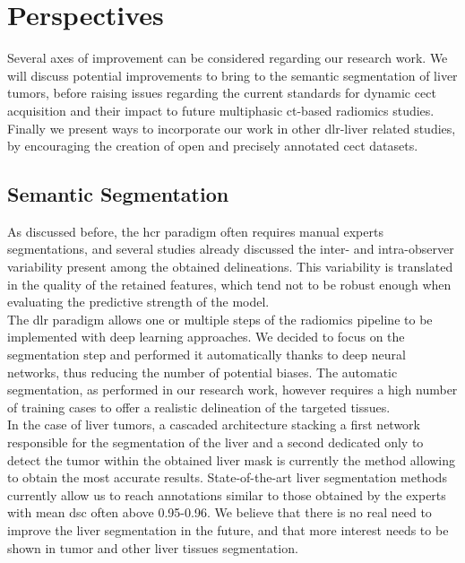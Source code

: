 \section*{Perspectives}
\label{sec:Perspectives}

Several axes of improvement can be considered regarding our research work.
We will discuss potential improvements to bring to the 
semantic segmentation of liver tumors, before raising issues regarding
the current standards for dynamic \ac{cect} acquisition and their impact to 
future multiphasic \ac{ct}-based radiomics studies.
Finally we present ways to incorporate our work in other \ac{dlr}-liver related 
studies, by encouraging the creation of open and precisely 
annotated \ac{cect} datasets.

\subsection*{Semantic Segmentation}
\label{subsec:SemanticSeg}

As discussed before, the \ac{hcr} paradigm often requires manual experts
segmentations, and several studies already discussed the inter- and
intra-observer variability present among the obtained delineations. This
variability is translated in the quality of the retained features, which
tend not to be robust enough when evaluating the predictive 
strength of the model.\\
The \ac{dlr} paradigm allows one or multiple steps of the radiomics pipeline to be implemented with deep learning approaches. We decided to focus on the segmentation step and performed it automatically thanks to deep neural networks, thus reducing the number of potential biases. The automatic segmentation, as
performed in our research work, however requires a high number of
training cases to offer a realistic delineation of the targeted tissues.\\
In the case of liver tumors, a cascaded architecture stacking a first
network responsible for the segmentation of the liver and a second
dedicated only to detect the tumor within the obtained liver mask is
currently the method allowing to obtain the most accurate results.
State-of-the-art liver segmentation methods currently allow us to reach
annotations similar to those obtained by the experts with mean \ac{dsc} often
above 0.95-0.96. We believe that there is no real need to improve the
liver segmentation in the future, and that more interest needs to be
shown in tumor and other liver tissues segmentation.

